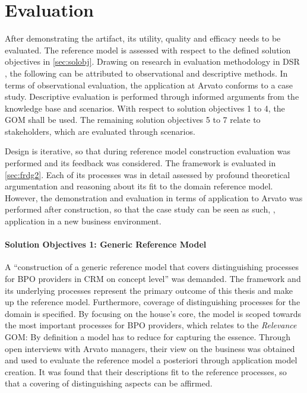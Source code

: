 
\chapter{Evaluation}

After demonstrating the artifact, its utility, quality and efficacy needs to be evaluated.  The reference model is assessed with respect to the defined solution objectives in \ref{sec:solobj}. Drawing on research in evaluation methodology in \acrshort{DSR} \citep[]{Hevner2004}, the following can be attributed to observational and descriptive methods. In terms of observational evaluation, the application at Arvato conforms to a case study. Descriptive evaluation is performed through informed arguments from the knowledge base and scenarios. With respect to solution objectives 1 to 4, the \acrfull{GOM} shall be used. The remaining solution objectives 5 to 7 relate to stakeholders, which are evaluated through scenarios.

Design is iterative, so that during reference model construction evaluation was performed and its feedback was considered. The framework is evaluated in \ref{sec:frdg2}. Each of its processes was in detail assessed by profound theoretical argumentation and reasoning about its fit to the domain reference model. However, the demonstration and evaluation in terms of application to Arvato was performed after construction, so that the case study can be seen as such, \eg, application in a new business environment. 


\subsubsection{Solution Objectives 1: Generic Reference Model}

A \enquote{construction of a generic reference model that covers distinguishing processes
	for BPO providers in CRM on concept level} was demanded. The framework and its underlying processes represent the primary outcome of this thesis and make up the reference model. Furthermore, coverage of distinguishing processes for the domain is specified. By focusing on the house's core, the model is scoped towards the most important processes for BPO providers, which relates to the \textit{Relevance} \acrshort{GOM}: By definition a model has to reduce for capturing the essence. Through open interviews with Arvato managers, their view on the business was obtained and used to evaluate the reference model a posteriori through application model creation. It was found that their descriptions fit to the reference processes, so that a covering of distinguishing aspects can be affirmed. 

